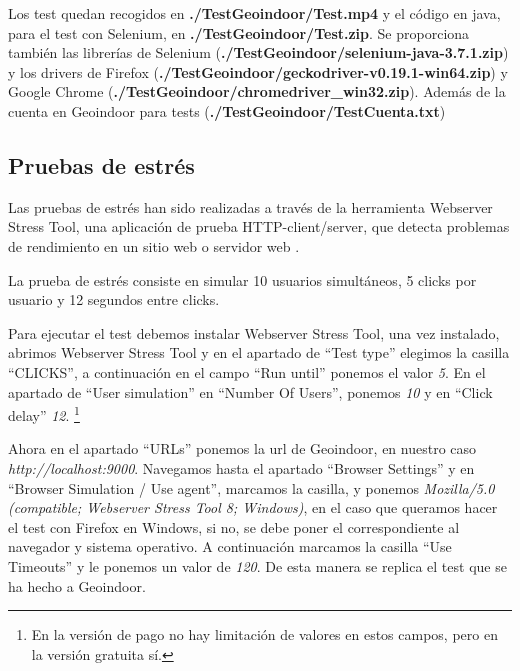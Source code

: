 

Los test quedan recogidos en \textbf{./TestGeoindoor/Test.mp4} y el código en java, para el test con Selenium, en \textbf{./TestGeoindoor/Test.zip}. Se proporciona también las librerías de Selenium (\textbf{./TestGeoindoor/selenium-java-3.7.1.zip}) y los drivers de Firefox (\textbf{./TestGeoindoor/geckodriver-v0.19.1-win64.zip}) y Google Chrome (\textbf{./TestGeoindoor/chromedriver\_win32.zip}). Además de la cuenta en Geoindoor para tests (\textbf{./TestGeoindoor/TestCuenta.txt})


\subsection{Pruebas de estrés}

Las pruebas de estrés han sido realizadas a través de la herramienta Webserver Stress Tool, una aplicación de prueba HTTP-client/server, que detecta problemas de rendimiento en un sitio web o servidor web \cite{webserverstresstool}. 

La prueba de estrés consiste en simular 10 usuarios simultáneos, 5 clicks por usuario y 12 segundos entre clicks.




Para ejecutar el test debemos instalar Webserver Stress Tool, una vez instalado, abrimos Webserver Stress Tool y en el apartado de ``Test type'' elegimos la casilla ``CLICKS'', a continuación en el campo ``Run until'' ponemos el valor \textit{5}. En el apartado de ``User simulation'' en ``Number Of Users'', ponemos \textit{10} y en ``Click delay'' \textit{12}. \footnote{En la versión de pago no hay limitación de valores en estos campos, pero en la versión gratuita sí.}

Ahora en el apartado ``URLs'' ponemos la url de Geoindoor, en nuestro caso \textit{http://localhost:9000}. Navegamos hasta el apartado ``Browser Settings'' y en ``Browser Simulation / Use agent'', marcamos la casilla, y ponemos \textit{Mozilla/5.0 (compatible; Webserver Stress Tool 8; Windows)}, en el caso que queramos hacer el test con Firefox en Windows, si no, se debe poner el correspondiente al navegador y sistema operativo. A continuación marcamos la casilla ``Use Timeouts'' y le ponemos un valor de \textit{120}. De esta manera se replica el test que se ha hecho a Geoindoor.

